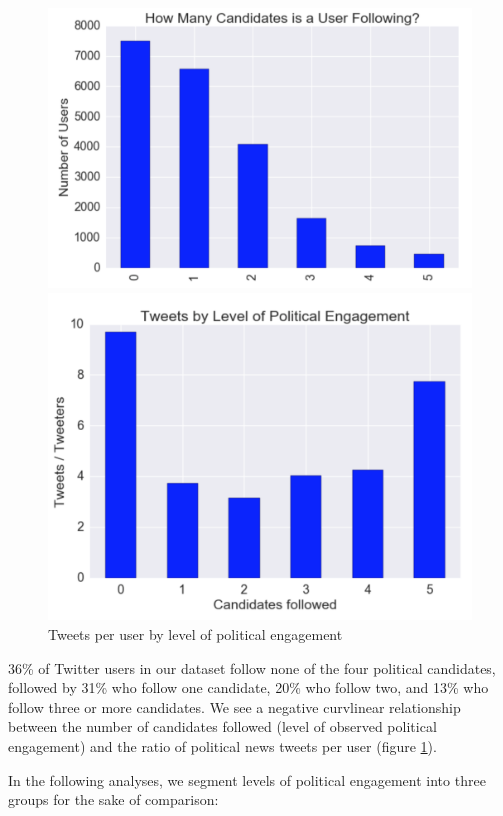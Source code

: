 \documentclass[letterpaper]{article}
\begin{document}
\begin{figure}[t!]  
\centering 
  \includegraphics[width=0.8\columnwidth]{users-vs-engagement}  


  \includegraphics[width=0.8\columnwidth]{tweet-ratio-vs-engagement}  
  \caption{Tweets per user by level of political engagement
    \label{fig:tweet-ratio-engagement}}
\end{figure}

36\% of Twitter users in our dataset follow none of the four political candidates, followed by 31\% who follow one candidate, 20\% who follow two, and 13\% who follow three or more candidates. We see a negative curvlinear relationship between the number of candidates followed (level of observed political engagement) and the ratio of political news tweets per user (figure \ref{fig:tweet-ratio-engagement}).


In the following analyses, we segment levels of political engagement into three groups for the sake of comparison:
\end{document}
